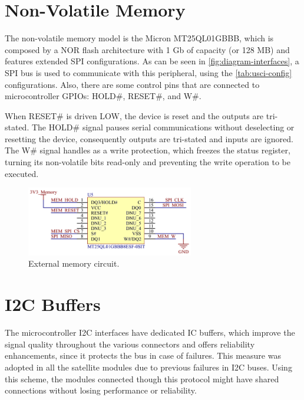 \section{Non-Volatile Memory}

The non-volatile memory model is the Micron MT25QL01GBBB, which is composed by a NOR flash architecture with 1 Gb of capacity (or 128 MB) and features extended SPI configurations. As can be seen in \autoref{fig:diagram-interfaces}, a SPI bus is used to communicate with this peripheral, using the \autoref{tab:usci-config} configurations. Also, there are some control pins that are connected to microcontroller GPIOs: HOLD\#, RESET\#, and W\#. 

When RESET\# is driven LOW, the device is reset and the outputs are tri-stated. The HOLD\# signal pauses serial communications without deselecting or resetting the device, consequently outputs are tri-stated and inputs are ignored. The W\# signal handles as a write protection, which freezes the status register, turning its non-volatile bits read-only and preventing the write operation to be executed.


\begin{figure}[!ht]
    \begin{center}
        \includegraphics[width=0.65\textwidth]{figures/ext-memory-circuit.png}
        \caption{External memory circuit.}
        \label{fig:ext-mem-circuit}
    \end{center}
\end{figure}

\section{I2C Buffers}

The microcontroller I2C interfaces have dedicated IC buffers, which improve the signal quality throughout the various connectors and offers reliability enhancements, since it protects the bus in case of failures. This measure was adopted in all the satellite modules due to previous failures in I2C buses. Using this scheme, the modules connected though this protocol might have shared connections without losing performance or reliability. 

